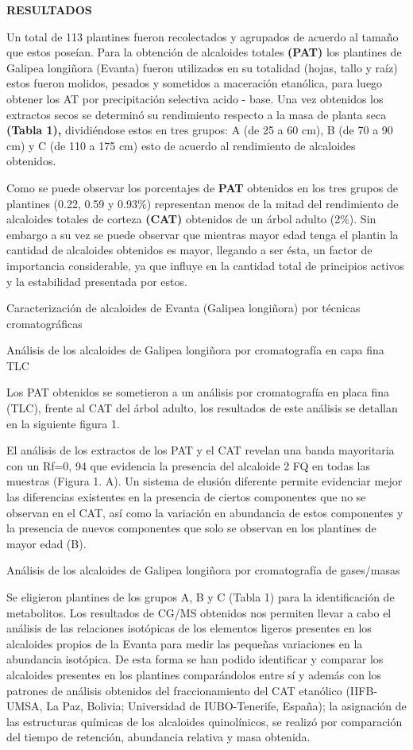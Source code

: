 \documentclass{article}
\begin{document}
\textbf{RESULTADOS}

Un total de 113 plantines fueron recolectados y agrupados de acuerdo al tamaño
que estos poseían. Para la obtención de alcaloides totales \textbf{(PAT) }
los plantines de Galipea longiñora (Evanta) fueron utilizados en su totalidad
(hojas, tallo y raíz) estos fueron molidos, pesados y sometidos a maceración
etanólica, para luego obtener los AT por precipitación selectiva acido - base.
Una vez obtenidos los extractos secos se determinó su rendimiento respecto a la
masa de planta seca \textbf{(Tabla 1), }
dividiéndose estos en tres grupos: A (de 25 a 60 cm), B (de 70 a 90 cm) y C (de
110 a 175 cm) esto de acuerdo al rendimiento de alcaloides obtenidos.

Como se puede observar los porcentajes de \textbf{PAT }
obtenidos en los tres grupos de plantines (0.22, 0.59 y 0.93\%) representan
menos de la mitad del rendimiento de alcaloides totales de corteza \textbf{(CAT)
}
obtenidos de un árbol adulto (2\%). Sin embargo a su vez se puede observar que
mientras mayor edad tenga el plantin la cantidad de alcaloides obtenidos es
mayor, llegando a ser ésta, un factor de importancia considerable, ya que
influye en la cantidad total de principios activos y la estabilidad presentada
por estos.

Caracterización de alcaloides de Evanta (Galipea longiñora) por técnicas
cromatográficas

Análisis de los alcaloides de Galipea longiñora por cromatografía en capa fina
TLC

Los PAT obtenidos se sometieron a un análisis por cromatografía en placa fina
(TLC), frente al CAT del árbol adulto, los resultados de este análisis se
detallan en la siguiente figura 1.

El análisis de los extractos de los PAT y el CAT revelan una banda mayoritaria
con un Rf=0, 94 que evidencia la presencia del alcaloide 2 FQ en todas las
muestras (Figura 1. A). Un sistema de elusión diferente permite evidenciar mejor
las diferencias existentes en la presencia de ciertos componentes que no se
observan en el CAT, así como la variación en abundancia de estos componentes y
la presencia de nuevos componentes que solo se observan en los plantines de
mayor edad (B).

Análisis de los alcaloides de Galipea longiñora por cromatografía de gases/masas

Se eligieron plantines de los grupos A, B y C (Tabla 1) para la identificación
de metabolitos. Los resultados de CG/MS obtenidos nos permiten llevar a cabo el
análisis de las relaciones isotópicas de los elementos ligeros presentes en los
alcaloides propios de la Evanta para medir las pequeñas variaciones en la
abundancia isotópica. De esta forma se han podido identificar y comparar los
alcaloides presentes en los plantines comparándolos entre sí y además con los
patrones de análisis obtenidos del fraccionamiento del CAT etanólico (IIFB-UMSA,
La Paz, Bolivia; Universidad de IUBO-Tenerife, España); la asignación de las
estructuras químicas de los alcaloides quinolínicos, se realizó por comparación
del tiempo de retención, abundancia relativa y masa obtenida.
\end{document}
